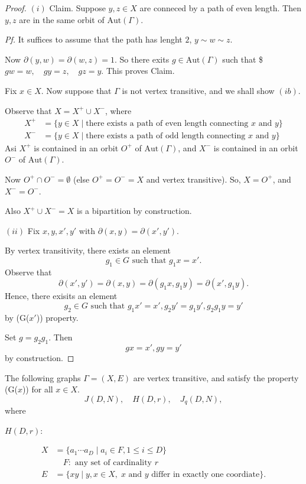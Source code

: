 \documentclass[
]{book}
\theoremstyle{definition}
\theoremstyle{definition}
\theoremstyle{definition}
\theoremstyle{definition}
\theoremstyle{remark}
\begin{document}
\begin{proof}
\((i)\)
Claim. Suppose \(y, z\in X\) are conneced by a path of even length. Then \(y, z\) are in the same orbit of \(\mathrm{Aut}(\Gamma)\).

\emph{Pf.}
It suffices to assume that the path has lenght \(2\), \(y \sim w\sim z\).

Now \(\partial(y,w) = \partial(w,z) = 1\). So there exits \(g\in \mathrm{Aut}(\Gamma)\) such that
\$\(gw = w, \quad gy = z, \quad gz = y.\)
This proves Claim.

Fix \(x\in X\). Now suppose that \(\Gamma\) is not vertex transitive, and we shall show \((ib)\).

Observe that \(X = X^+ \cup X^-\), where
\begin{align}
X^+ & = \{y\in X\mid \text{there exists a path of even length connecting $x$ and $y$}\}\\
X^- & = \{y\in X\mid \text{there exists a path of odd length connecting $x$ and $y$}\}
\end{align}
Asi \(X^+\) is contained in an orbit \(O^+\) of \(\mathrm{Aut}(\Gamma)\), and \(X^-\) is contained in an orbit \(O^-\) of \(\mathrm{Aut}(\Gamma)\).

Now \(O^+\cap O^- = \emptyset\) (else \(O^+ = O^- = X\) and vertex transitive).
So,
\(X = O^+\), and \(X^- = O^-\).

Also \(X^+ \cup X^- = X\) is a bipartition by construction.

\((ii)\) Fix \(x, y, x', y'\) with \(\partial(x,y) = \partial(x',y')\).

By vertex transitivity, there exists an element
\[g_1\in G \text{ such that } g_1x = x'.\]
Observe that
\[\partial(x', y') = \partial(x,y) = \partial(g_1x, g_1y) = \partial(x', g_1y).\]
Hence, there exisits an element
\[g_2\in G \text{ such that } g_1x' = x', g_2y' = g_1y', g_2g_1y = y'\]
by (G(\(x'\))) property.

Set \(g = g_2g_1\). Then
\[gx = x', gy = y'\]
by construction.
\end{proof}

The following graphs \(\Gamma = (X, E)\) are vertex transitive, and satisfy the property (G(\(x\))) for all \(x\in X\).
\[J(D, N), \quad H(D, r), \quad J_q(D,N),\]
where

\(H(D,r)\):

\begin{align}
X & = \{a_1\cdots a_D\mid a_i\in F, 1\leq i\leq D\}\\
& \quad F: \text{ any set of cardinality $r$}\\
E & = \{xy\mid y, x\in X, \; \text{$x$ and $y$ differ in exactly one coordiate}\}.
\end{align}
\end{document}
